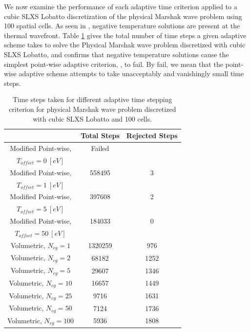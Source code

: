 We now examine the performance of each adaptive time criterion applied to a cubic SLXS Lobatto discretization of the physical Marshak wave problem using 100 spatial cells.
As seen in , negative temperature solutions are present at the thermal wavefront.
Table \ref{tbl:p3_counts} gives the total number of time steps a given adaptive scheme takes to solve the Physical Marshak wave problem discretized with cubic SLXS Lobatto, and confirms
that negative temperature solutions cause the simplest point-wise adaptive criterion, , to fail.
By fail, we mean that the point-wise adaptive scheme attempts to take unacceptably and vanishingly small time steps.
\begin{table}[!htp]
\centering
\caption{Time steps taken for different adaptive time stepping criterion for physical Marshak wave problem discretized with cubic SLXS Lobatto and 100 cells.}
\label{tbl:p3_counts}
\begin{tabular}{|c|c|c|}
\hline
{} &  Total Steps & Rejected Steps \\
\hline
Modified Point-wise, &   Failed & \\
$T_{offset} = 0~[eV]$ &    &   \\
\hline
Modified Point-wise, &   558495  & 3 \\
$T_{offset} = 1~[eV]$ &     &  \\
\hline
Modified Point-wise, &  397608  & 2\\
$T_{offset} = 5~[eV]$ &    &  \\
\hline
Modified Point-wise, &  184033  & 0\\
$T_{offset} = 50~[eV]$ &    &  \\
\hline
Volumetric, $N_{cg} = 1$ &  1320259  & 976 \\
\hline
Volumetric, $N_{cg} = 2$ & 68182   & 1252 \\
\hline
Volumetric, $N_{cg} = 5$ & 29607   & 1346 \\
\hline
Volumetric, $N_{cg} = 10$ & 16657   & 1449 \\
\hline
Volumetric, $N_{cg} = 25$ & 9716   & 1631 \\
\hline
Volumetric, $N_{cg} = 50$ & 7124   & 1736 \\
\hline
Volumetric, $N_{cg} = 100$ & 5936   & 1808 \\
\hline
\end{tabular}
\end{table}

